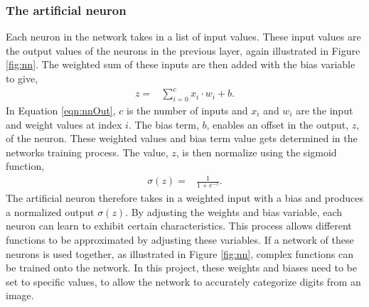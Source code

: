 \subsubsection{The artificial neuron}
Each neuron in the network takes in a list of input values. These input values are the output values of the neurons in the previous layer, again illustrated in Figure \ref{fig:nn}. The weighted sum of these inputs are then added with the bias variable to give,
\begin{align}
  z =  &\displaystyle{\sum_{i=0}^{c} x_{i}\cdot w_{i} + b}.
\label{eqn:nnOut}
\end{align}
In Equation \ref{eqn:nnOut}, $c$ is the number of inputs and $x_{i}$ and $w_{i}$ are the input and weight values at index $i$. The bias term, $b$, enables an offset in the output, $z$, of the neuron. These weighted values and bias term value gets determined in the networks training process. The value, $z$, is then normalize using the sigmoid function,
\begin{align}
  \sigma(z) =  &\displaystyle{\frac{1}{1 + e^{-z}}}.
\label{eqn:sigmoid}
\end{align}
The artificial neuron therefore takes in a weighted input with a bias and produces a normalized output $\sigma(z)$. By adjusting the weights and bias variable, each neuron can learn to exhibit certain characteristics. This process allows different functions to be approximated by adjusting these variables. If a network of these neurons is used together, as illustrated in Figure \ref{fig:nn}, complex functions can be trained onto the network. In this project, these weights and biases need to be set to specific values, to allow the network to accurately categorize digits from an image.

